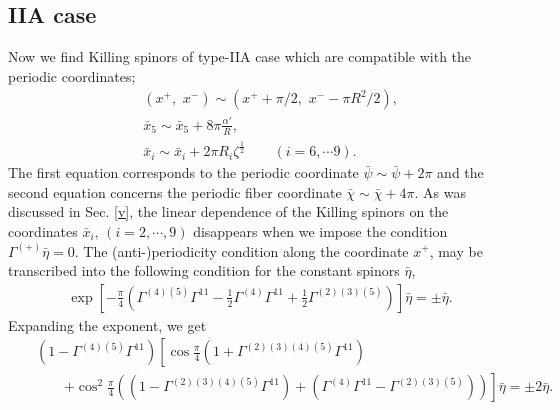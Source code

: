 \documentclass[a4paper,12pt]{article}
\begin{document}
\subsection{IIA case}

Now we find Killing spinors of type-IIA case which are compatible with the periodic coordinates; 
\begin{eqnarray}\label{2aperiod}
&&\left(x^+,\,\,x^-\right)\sim\left(x^++\pi/2,\,\,x^--\pi R^2/2\right),\nonumber\\
&&\bar{x}_5\sim \bar{x}_5+8\pi\frac{\alpha'}{R},\nonumber\\
&&\bar{x}_i\sim \bar{x}_i+2\pi R_i\zeta^\frac{1}{2}\qquad (i=6,\cdots 9).
\end{eqnarray}
The first equation corresponds to the periodic coordinate $\bar{\psi}\sim\bar{\psi}+2\pi$ and the second equation concerns the periodic fiber coordinate $\bar{\chi}\sim \bar{\chi}+4\pi$. As was discussed in Sec. \ref{v}, the linear dependence of the Killing spinors on the coordinates $\bar{x}_i,\,(i=2,\cdots,9)$ disappears when we impose the condition $\Gamma^{(+)}\bar{\eta}=0$. The (anti-)periodicity condition along the coordinate $x^+$, may be transcribed into the following condition for the constant spinors $\bar{\eta}$,
\begin{eqnarray}
\exp{\left[-\frac{\pi}{4}\left(\Gamma^{(4)(5)}\Gamma^{11}-\frac{1}{2}\Gamma^{(4)}\Gamma^{11}
+\frac{1}{2}\Gamma^{(2)(3)(5)}\right)\right]}\bar{\eta}=\pm\bar{\eta}.
\end{eqnarray}
Expanding the exponent, we get
\begin{eqnarray}\label{expo}
&&\left(1-\Gamma^{(4)(5)}\Gamma^{11}\right)\left[\cos{\frac{\pi}{4}}\left(1+\Gamma^{(2)(3)(4)(5)}\Gamma^{11}\right)\right.\nonumber\\
&&\qquad\left.+\cos^2{\frac{\pi}{4}}\left(\left(1-\Gamma^{(2)(3)(4)(5)}\Gamma^{11}\right)+\left(\Gamma^{(4)}\Gamma^{11}-\Gamma^{(2)(3)(5)}\right)\right)\right]\bar{\eta}
=\pm 2\bar{\eta}.
\end{eqnarray}
\end{document}
